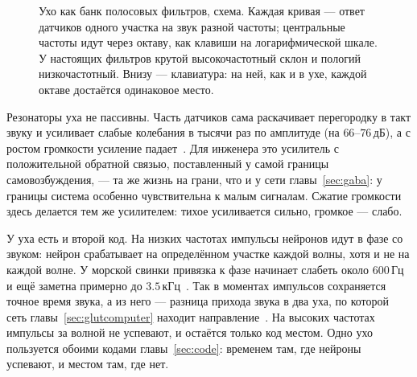 \begin{figure}[t]
\centering
{}
\caption{Ухо как банк полосовых фильтров, схема. Каждая кривая --- ответ датчиков одного участка на звук разной частоты; центральные частоты идут через октаву, как клавиши на логарифмической шкале. У настоящих фильтров крутой высокочастотный склон и пологий низкочастотный. Внизу --- клавиатура: на ней, как и в ухе, каждой октаве достаётся одинаковое место.}
\label{fig:filterbank}
\end{figure}

Резонаторы уха не пассивны. Часть датчиков сама раскачивает перегородку в такт звуку и усиливает слабые колебания в тысячи раз по амплитуде (на $66$--$76$\,дБ), а с ростом громкости усиление падает~\cite{Ruggero1997,Robles2001}. Для инженера это усилитель с положительной обратной связью, поставленный у самой границы самовозбуждения, --- та же жизнь на грани, что и у сети главы~\ref{sec:gaba}: у границы система особенно чувствительна к малым сигналам. Сжатие громкости здесь делается тем же усилителем: тихое усиливается сильно, громкое --- слабо.

У уха есть и второй код. На низких частотах импульсы нейронов идут в фазе со звуком: нейрон срабатывает на определённом участке каждой волны, хотя и не на каждой волне. У морской свинки привязка к фазе начинает слабеть около $600$\,Гц и ещё заметна примерно до $3.5$\,кГц~\cite{PalmerRussell1986}. Так в моментах импульсов сохраняется точное время звука, а из него --- разница прихода звука в два уха, по которой сеть главы~\ref{sec:glutcomputer} находит направление~\cite{Grothe2010}. На высоких частотах импульсы за волной не успевают, и остаётся только код местом. Одно ухо пользуется обоими кодами главы~\ref{sec:code}: временем там, где нейроны успевают, и местом там, где нет.

